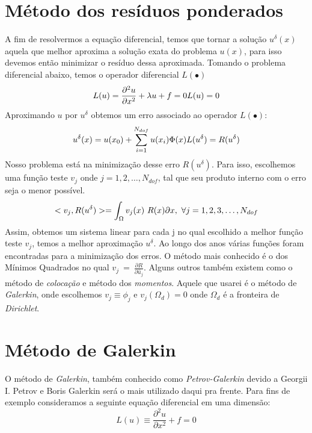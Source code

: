 \section{Método dos resíduos ponderados}
 A fim de resolvermos a equação diferencial, temos que tornar a solução $u^\delta(x)$ aquela que melhor aproxima a solução exata do problema $u(x)$, para isso devemos então minimizar o resíduo dessa aproximada. Tomando o problema diferencial abaixo, temos o operador diferencial $L(\bullet)$
 \begin{equation}
    L(u) = \frac{\partial^2 u}{\partial x^2} + \lambda u + f = 0 \\
    L(u) = 0
 \end{equation}
 Aproximando $u$ por $u^\delta$ obtemos um erro associado ao operador $L(\bullet)$:
 \begin{equation}
 	u^\delta(x) = u(x_0) + \sum^{N_{dof}}_{i = 1} u(x_i) \Phi(x)\\
    L(u^\delta) = R(u^\delta)
\end{equation}
Nosso problema está na minimização desse erro $R(u^\delta)$. Para isso, escolhemos uma função teste $v_j$ onde $j = 1,2,\dots, N_{dof}$, tal que seu produto interno com o erro seja o menor possível.
\begin{equation}
    <v_j,R(u^\delta)> = \int_{\Omega} v_j(x)\ R(x) \partial x,\ \forall j = 1,2,3,\dots,N_{dof}\\
\end{equation}
Assim, obtemos um sistema linear para cada j no qual escolhido a melhor função teste $v_j$, temos a melhor aproximação $u^\delta$. Ao longo dos anos várias funções foram encontradas para a minimização dos erros. O método mais conhecido é o dos Mínimos Quadrados no qual $v_j\ =\ \frac{\partial R}{\partial \hat{u}_j}$. Alguns outros também existem como o método de \emph{colocação} e método dos \emph{momentos}. Aquele que usarei é o método de \emph{Galerkin}, onde escolhemos $v_j \equiv \phi_j$ e $v_j(\Omega_d) = 0$ onde $\Omega_d$ é a fronteira de \emph{Dirichlet}.

\section{Método de Galerkin}
 O método de \emph{Galerkin}, também conhecido como \emph{Petrov-Galerkin} devido a Georgii I. Petrov e Boris Galerkin será o mais utilizado daqui pra frente. Para fins de exemplo consideramos a seguinte equação diferencial em uma dimensão:
 \begin{equation}\label{eq:eq_dif}
 L(u) \equiv \frac{\partial^2 u}{\partial x^2} + f = 0
 \end{equation}
 
